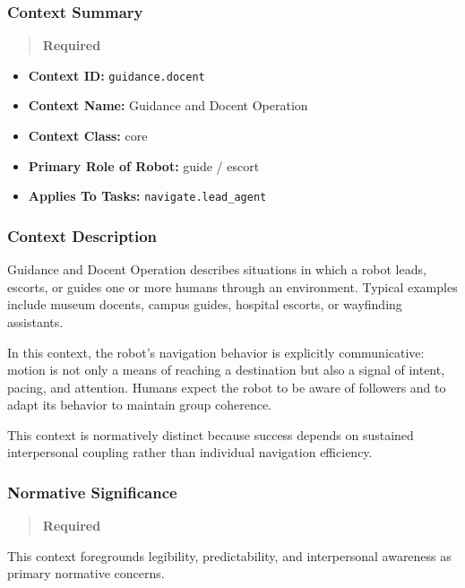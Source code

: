 \documentclass[utf8]{frontiers_suppmat} %
\providecommand{\tightlist}{%
  \setlength{\itemsep}{0pt}\setlength{\parskip}{0pt}}
\begin{document}
\subsubsection{Context Summary}\label{context-summary}

\begin{quote}
\textbf{Required}
\end{quote}

\begin{itemize}
\tightlist
\item
  \textbf{Context ID:} \texttt{guidance.docent}
\item
  \textbf{Context Name:} Guidance and Docent Operation
\item
  \textbf{Context Class:} core
\item
  \textbf{Primary Role of Robot:} guide / escort
\item
  \textbf{Applies To Tasks:}
  \texttt{navigate.lead\_agent}
\end{itemize}

\subsubsection{Context Description}\label{context-description}

Guidance and Docent Operation describes situations in which a robot
leads, escorts, or guides one or more humans through an environment.
Typical examples include museum docents, campus guides, hospital
escorts, or wayfinding assistants.

In this context, the robot's navigation behavior is explicitly
communicative: motion is not only a means of reaching a destination but
also a signal of intent, pacing, and attention. Humans expect the robot
to be aware of followers and to adapt its behavior to maintain group
coherence.

This context is normatively distinct because success depends on
sustained interpersonal coupling rather than individual navigation
efficiency.

\subsubsection{Normative Significance}\label{normative-significance}

\begin{quote}
\textbf{Required}
\end{quote}

This context foregrounds legibility, predictability, and interpersonal
awareness as primary normative concerns.
\end{document}
